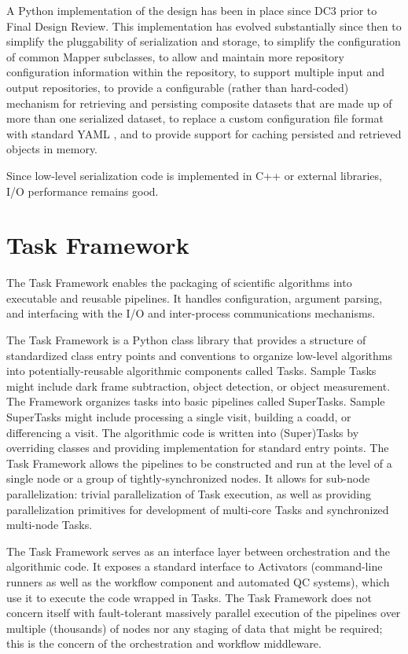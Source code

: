 \documentclass[DM,toc]{lsstdoc}
\begin{document}
A Python implementation of the design has been in place since DC3 prior to
Final Design Review.  This implementation has evolved substantially since then
to simplify the pluggability of serialization and storage, to simplify the
configuration of common Mapper subclasses, to allow and maintain more
repository configuration information within the repository, to support multiple
input and output repositories, to provide a configurable (rather than
hard-coded) mechanism for retrieving and persisting composite datasets that are
made up of more than one serialized dataset, to replace a custom configuration
file format with standard YAML \citep{YAML}, and to provide support for caching
persisted and retrieved objects in memory.

Since low-level serialization code is implemented in C++ or external libraries,
I/O performance remains good.


\section{Task Framework}\label{task-framework}

The Task Framework enables the packaging of scientific algorithms into
executable and reusable pipelines. It handles configuration, argument parsing,
and interfacing with the I/O and inter-process communications mechanisms.

The Task Framework is a Python class library that provides a structure of
standardized class entry points and conventions to organize low-level
algorithms into potentially-reusable algorithmic components called Tasks.
Sample Tasks might include dark frame subtraction, object detection, or object
measurement.  The Framework organizes tasks into basic pipelines called
SuperTasks.  Sample SuperTasks might include processing a single visit,
building a coadd, or differencing a visit. The algorithmic code is written into
(Super)Tasks by overriding classes and providing implementation for standard
entry points. The Task Framework allows the pipelines to be constructed and run
at the level of a single node or a group of tightly-synchronized nodes. It
allows for sub-node parallelization: trivial parallelization of Task execution,
as well as providing parallelization primitives for development of multi-core
Tasks and synchronized multi-node Tasks.

The Task Framework serves as an interface layer between orchestration
and the algorithmic code. It exposes a standard interface to Activators
(command-line runners as well as the workflow component and automated QC
systems), which use it to execute the code wrapped in Tasks. The Task Framework
does not concern itself with fault-tolerant massively parallel execution of the
pipelines over multiple (thousands) of nodes nor any staging of data that might
be required; this is the concern of the orchestration and workflow middleware.
\end{document}
